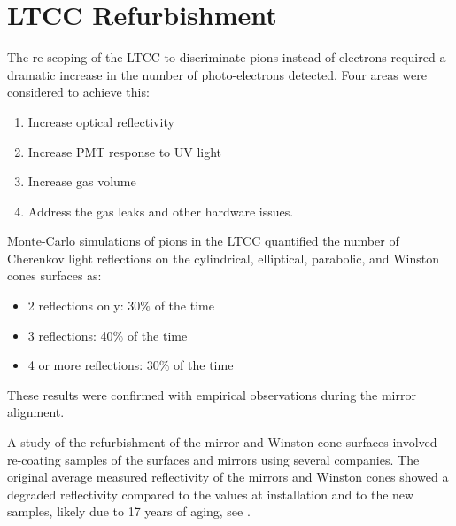 \section{LTCC Refurbishment}


The re-scoping of the LTCC to discriminate pions instead of electrons required a dramatic increase in the
number of photo-electrons detected. Four areas were considered to achieve this:

\begin{enumerate}
	\item Increase optical reflectivity
	\item Increase PMT response to UV light
	\item Increase gas volume
	\item Address the gas leaks and other hardware issues.
\end{enumerate}


Monte-Carlo simulations of pions in the LTCC quantified the number of Cherenkov light  reflections on the cylindrical, elliptical,
parabolic, and Winston cones surfaces as:

\begin{itemize}
	\item 2 reflections only: 30$\%$ of the time
	\item 3 reflections: 40$\%$ of the time
	\item 4 or more reflections: 30$\%$ of the time
\end{itemize}

\noindent
These results were confirmed with empirical observations during the mirror alignment.

A study of the refurbishment of the mirror and Winston cone surfaces
involved re-coating samples of the surfaces and mirrors using several companies.
The original average measured reflectivity of the mirrors and Winston cones
showed a degraded reflectivity compared to the values at installation and to
the new samples, likely due to  17 years of aging, see .


